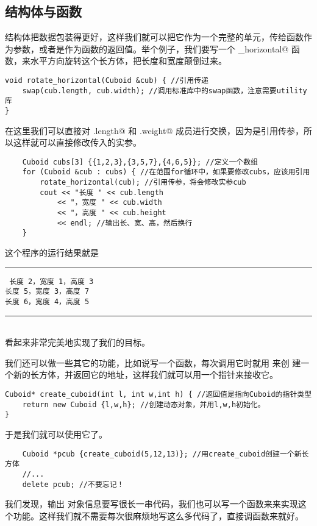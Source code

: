 \subsection*{结构体与函数}
结构体把数据包装得更好，这样我们就可以把它作为一个完整的单元，传给函数作为参数，或者是作为函数的返回值。举个例子，我们要写一个 \lstinline@rotate_horizontal@ 函数，来水平方向旋转这个长方体，把长度和宽度颠倒过来。
\begin{lstlisting}
void rotate_horizontal(Cuboid &cub) { //引用传递
    swap(cub.length, cub.width); //调用标准库中的swap函数，注意需要utility库
}
\end{lstlisting}
在这里我们可以直接对 \lstinline@cub.length@ 和 \lstinline@cub.weight@ 成员进行交换，因为是引用传参，所以这样就可以直接修改传入的实参。\par
\begin{lstlisting}
    Cuboid cubs[3] {{1,2,3},{3,5,7},{4,6,5}}; //定义一个数组
    for (Cuboid &cub : cubs) { //在范围for循环中，如果要修改cubs，应该用引用
        rotate_horizontal(cub); //引用传参，将会修改实参cub
        cout << "长度 " << cub.length
            << "，宽度 " << cub.width
            << "，高度 " << cub.height
            << endl; //输出长、宽、高，然后换行
    }
\end{lstlisting}
这个程序的运行结果就是\\\noindent\rule{\linewidth}{.2pt}\texttt{
长度 2，宽度 1，高度 3\\
长度 5，宽度 3，高度 7\\
长度 6，宽度 4，高度 5
}\\\noindent\rule{\linewidth}{.2pt}\\
看起来非常完美地实现了我们的目标。\par
我们还可以做一些其它的功能，比如说写一个函数，每次调用它时就用 \lstinline@new@ 来创 建一个新的长方体，并返回它的地址，这样我们就可以用一个指针来接收它。
\begin{lstlisting}
Cuboid* create_cuboid(int l, int w,int h) { //返回值是指向Cuboid的指针类型
    return new Cuboid {l,w,h}; //创建动态对象，并用l,w,h初始化。
}
\end{lstlisting}
于是我们就可以使用它了。
\begin{lstlisting}
    Cuboid *pcub {create_cuboid(5,12,13)}; //用create_cuboid创建一个新长方体
    //...
    delete pcub; //不要忘记！
\end{lstlisting}\par
我们发现，输出 \lstinline@Cuboid@ 对象信息要写很长一串代码，我们也可以写一个函数来来实现这个功能。这样我们就不需要每次很麻烦地写这么多代码了，直接调函数来就好。
